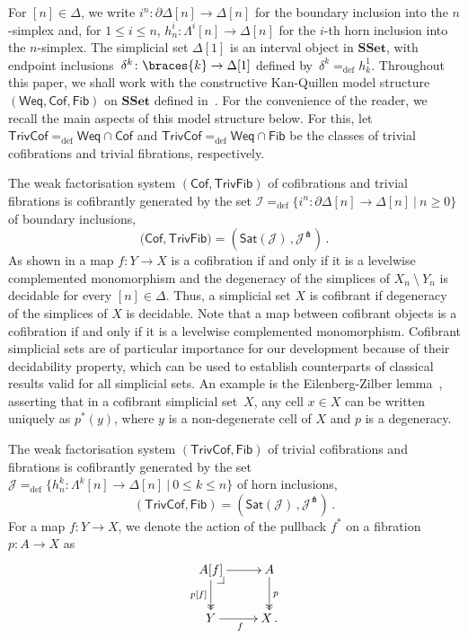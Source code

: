 \documentclass[reqno,10pt,a4paper,oneside,draft]{amsart}
\makeatletter
\numberwithin{equation}{section}
\theoremstyle{mythm}
\theoremstyle{mydef}
\theoremstyle{myrmk}
\newcommand{\pullback}[1]{\save*!/#1-1.2pc/#1:(-1,1)@^{|-}\restore}
\newcommand{\drpullback}{\pullback{dr}}
\newcommand{\ie}{\text{i.e.\ }}
\newcommand{\defeq}{=_{\operatorname{def}}}
\newcommand{\co}{\colon}
\newcommand{\SSet}{\mathbf{SSet}}
\newcommand{\Weq}{\mathsf{Weq}}
\DeclarePairedDelimiter\braces\lbrace\rbrace
\newcommand{\cal}[1]{\mathcal{#1}}
\newcommand{\Cof}{\mathsf{Cof}}
\newcommand{\TrivFib}{\mathsf{TrivFib}}
\newcommand{\Fib}{\mathsf{Fib}}
\newcommand{\TrivCof}{\mathsf{TrivCof}}
\newcommand{\kcyl}{\delta^k}
\makeatother
\begin{document}
For $[n] \in \Delta$, we write $i^n \co  \partial \Delta[n] \to \Delta[n]$ for the boundary inclusion into the $n$-simplex and, for $1 \leq i \leq n$,  
$h^i_n  \co \Lambda^i[n] \to \Delta[n]$  for the $i$-th horn inclusion into the $n$-simplex. The simplicial set $\Delta[1]$ is an interval object in $\SSet$, with endpoint inclusions~$\kcyl \co \braces{ k} \to \Delta[1]$ defined by~$\kcyl \defeq h^1_k$. Throughout this paper, we shall work  with the constructive 
Kan-Quillen model structure $(\Weq, \Cof, \Fib)$ on $\SSet$ defined in~\cite{henry2019qms}. 
For the convenience of the reader, we recall the main aspects of this model structure below.
For this, let $\TrivCof \defeq \Weq \cap \Cof$ and $\TrivCof \defeq \Weq \cap \Fib$ be the classes of trivial cofibrations and trivial fibrations,
respectively. 

The weak factorisation system $(\Cof, \TrivFib)$ of cofibrations and trivial fibrations  is cofibrantly generated by the set $\cal{I} \defeq \{ i^n \co  \partial \Delta[n] \to \Delta[n] \ | \ n \geq 0 \}$  of boundary 
inclusions, \ie 
\[
\big( \Cof, \TrivFib \big) = ( \mathsf{Sat}(\cal{J}) \, , \cal{J}^\pitchfork) \, .
\]
As shown in \cite[Proposition~5.1.4]{henry2018wms} a map $f \co Y \to X$ is a cofibration if  and only if 
it is a levelwise complemented monomorphism and the degeneracy of the simplices of $X_n ~\setminus~Y_n$ is decidable for every $[n] \in \Delta$. Thus, a simplicial set $X$ is
cofibrant if  degeneracy of the simplices of $X$ is decidable.
Note that a map between cofibrant objects is a cofibration
if and only if it is a levelwise complemented monomorphism. 
Cofibrant simplicial sets are of particular importance for our development because of their decidability property, which can be used to establish counterparts of classical results valid for all simplicial sets. An example is the Eilenberg-Zilber lemma~\cite[Lemma~5.1.2]{henry2018wms}, asserting that in a cofibrant simplicial set~$X$, any cell $x \in X$ can be written uniquely as $p^*(y)$, where $y$ is a non-degenerate cell of $X$ and $p$ is a degeneracy. 
\medskip

The weak factorisation system $(\TrivCof, \Fib)$ of  trivial cofibrations and fibrations is cofibrantly 
generated by the set $\cal{J} \defeq \{ h^k_n  \co \Lambda^k[n] \to \Delta[n]  \ | \ 0 \leq k \leq n \}$ of horn 
inclusions, \ie 
\[
(\TrivCof, \Fib) = ( \mathsf{Sat}(\cal{J}) \, , \cal{J}^\pitchfork) \, .
\] 
For a map $f \co Y \to X$, we denote the action of the pullback $f^*$ on a fibration~$p \co A \to X$ as
\[
\xymatrix{
A[f] \ar[r] \drpullback \ar@{->>}[d]_{p[f]} & A \ar@{->>}[d]^{p} \\
Y \ar[r]_f & X \, .}
\]
\end{document}
